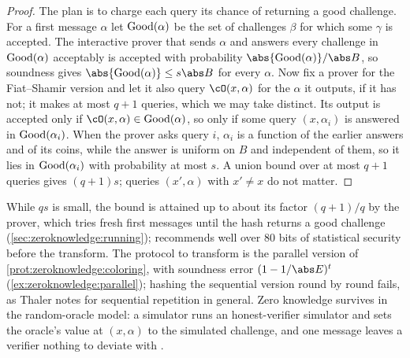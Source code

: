\begin{refsection}

\begin{proof}
The plan is to charge each query its chance of returning a good challenge. For a first message $\alpha$ let $\mathrm{Good}(\alpha)$ be the set of challenges $\beta$ for which some $\gamma$ is accepted. The interactive prover that sends $\alpha$ and answers every challenge in $\mathrm{Good}(\alpha)$ acceptably is accepted with probability $\abs{\zeroknowledgegood(\alpha)}/\abs B$, so soundness gives $\abs{\zeroknowledgegood(\alpha)}\le s\abs B$ for every $\alpha$. Now fix a prover for the Fiat--Shamir version and let it also query $\cO(x,\alpha)$ for the $\alpha$ it outputs, if it has not; it makes at most $q+1$ queries, which we may take distinct. Its output is accepted only if $\cO(x,\alpha)\in\zeroknowledgegood(\alpha)$, so only if some query $(x,\alpha_i)$ is answered in $\mathrm{Good}(\alpha_i)$. When the prover asks query $i$, $\alpha_i$ is a function of the earlier answers and of its coins, while the answer is uniform on $B$ and independent of them, so it lies in $\mathrm{Good}(\alpha_i)$ with probability at most $s$. A union bound over at most $q+1$ queries gives $(q+1)s$; queries $(x',\alpha)$ with $x'\ne x$ do not matter.
\end{proof}

While $qs$ is small, the bound is attained up to about its factor $(q+1)/q$ by the  prover, which tries fresh first messages until the hash returns a good challenge (\cref{sec:zeroknowledge:running}); \textcite[Section~5.3]{Thaler2022} recommends well over $80$ bits of statistical security before the transform. The protocol to transform is the parallel version of \cref{prot:zeroknowledge:coloring}, with soundness error $(1-1/\abs E)^t$ (\cref{ex:zeroknowledge:parallel}); hashing the sequential version round by round fails, as Thaler notes for sequential repetition in general. Zero knowledge survives in the random-oracle model: a simulator runs an honest-verifier simulator and sets the oracle's value at $(x,\alpha)$ to the simulated challenge, and one message leaves a verifier nothing to deviate with \parencite[Section~11.1]{Thaler2022}.


\end{refsection}
